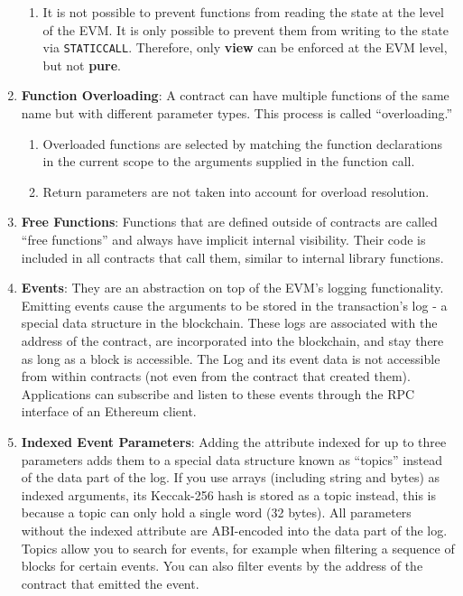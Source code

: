 \begin{enumerate}
\begin{enumerate}
    \item It is not possible to prevent functions from reading the state at the level of the EVM. It is only possible to prevent them from writing to the state via \verb|STATICCALL|. Therefore,  only \textbf{view} can be enforced at the EVM level, but not \textbf{pure}.
    \end{enumerate}

\item\textbf{Function Overloading}: A contract can have multiple functions of the same name but with different parameter types. This process is called “overloading.”
    \begin{enumerate}
    \item Overloaded functions are selected by matching the function declarations in the current scope to the arguments supplied in the function call.
    \item Return parameters are not taken into account for overload resolution.
    \end{enumerate}

\item\textbf{Free Functions}: Functions that are defined outside of contracts are called “free functions” and always have implicit internal visibility. Their code is included in all contracts that call them, similar to internal library functions.

\item\textbf{Events}: They are an abstraction on top of the EVM’s logging functionality. Emitting events cause the arguments to be stored in the transaction’s log - a special data structure in the blockchain. These logs are associated with the address of the contract, are incorporated into the blockchain, and stay there as long as a block is accessible. The Log and its event data is not accessible from within contracts (not even from the contract that created them). Applications can subscribe and listen to these events through the RPC interface of an Ethereum client.

\item\textbf{Indexed Event Parameters}: Adding the attribute indexed for up to three parameters adds them to a special data structure known as “topics” instead of the data part of the log. If you use arrays (including string and bytes) as indexed arguments, its Keccak-256 hash is stored as a topic instead, this is because a topic can only hold a single word (32 bytes). All parameters without the indexed attribute are ABI-encoded into the data part of the log. Topics allow you to search for events, for example when filtering a sequence of blocks for certain events. You can also filter events by the address of the contract that emitted the event.


\end{enumerate}
